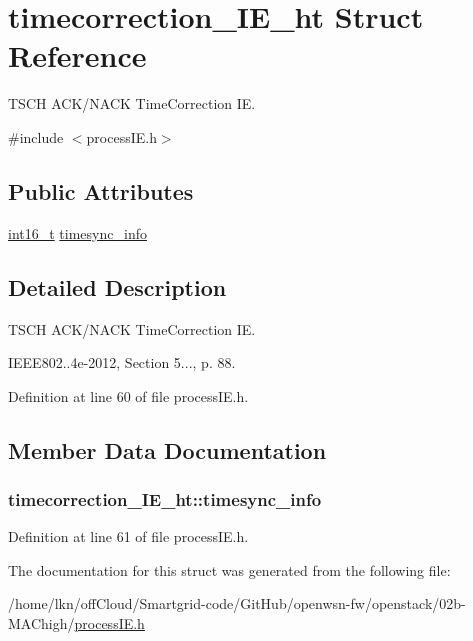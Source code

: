 \hypertarget{structtimecorrection___i_e__ht}{}\section{timecorrection\+\_\+\+I\+E\+\_\+ht Struct Reference}
\label{structtimecorrection___i_e__ht}


T\+S\+CH A\+C\+K/\+N\+A\+CK Time\+Correction IE.  




{\ttfamily \#include $<$process\+I\+E.\+h$>$}

\subsection*{Public Attributes}
\begin{DoxyCompactItemize}
\item 
\hyperlink{_p_e___types_8h_a932e6ccc3d54c58f761c1aead83bd6d7}{int16\+\_\+t} \hyperlink{structtimecorrection___i_e__ht_ab3acff873eecbb658602b89e73edb9b5}{timesync\+\_\+info}
\end{DoxyCompactItemize}


\subsection{Detailed Description}
T\+S\+CH A\+C\+K/\+N\+A\+CK Time\+Correction IE. 

I\+E\+E\+E802..\+4e-\/2012, Section 5..., p. 88. 

Definition at line 60 of file process\+I\+E.\+h.



\subsection{Member Data Documentation}
\subsubsection[{\texorpdfstring{timesync\+\_\+info}{timesync_info}}]{ timecorrection\+\_\+\+I\+E\+\_\+ht\+::timesync\+\_\+info}\hypertarget{structtimecorrection___i_e__ht_ab3acff873eecbb658602b89e73edb9b5}{}\label{structtimecorrection___i_e__ht_ab3acff873eecbb658602b89e73edb9b5}


Definition at line 61 of file process\+I\+E.\+h.



The documentation for this struct was generated from the following file\+:\begin{DoxyCompactItemize}
\item 
/home/lkn/off\+Cloud/\+Smartgrid-\/code/\+Git\+Hub/openwsn-\/fw/openstack/02b-\/\+M\+A\+Chigh/\hyperlink{process_i_e_8h}{process\+I\+E.\+h}\end{DoxyCompactItemize}
